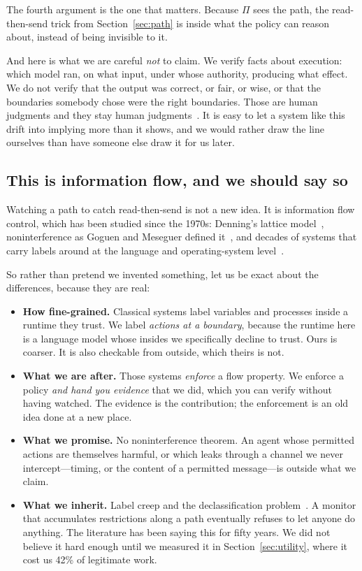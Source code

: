 \documentclass[11pt]{article}
\begin{document}
The fourth argument is the one that matters. Because $\Pi$ sees the path, the
read-then-send trick from Section~\ref{sec:path} is inside what the policy can
reason about, instead of being invisible to it.

And here is what we are careful \emph{not} to claim. We verify facts about
execution: which model ran, on what input, under whose authority, producing
what effect. We do not verify that the output was correct, or fair, or wise,
or that the boundaries somebody chose were the right boundaries. Those are
human judgments and they stay human judgments~\cite{iso42001}. It is easy to
let a system like this drift into implying more than it shows, and we would
rather draw the line ourselves than have someone else draw it for us later.

\subsection{This is information flow, and we should say so}
\label{sec:ifc}

Watching a path to catch read-then-send is not a new idea. It is information
flow control, which has been studied since the 1970s: Denning's lattice
model~\cite{denning1976,denning1977}, noninterference as
Goguen and Meseguer defined it~\cite{goguen1982}, and decades of systems that
carry labels around at the language and operating-system
level~\cite{myers1997,myers1999,sabelfeld2003,histar,flume}.

So rather than pretend we invented something, let us be exact about the
differences, because they are real:

\begin{itemize}[itemsep=2pt,topsep=2pt]
\item \textbf{How fine-grained.} Classical systems label variables and
processes inside a runtime they trust. We label \emph{actions at a boundary},
because the runtime here is a language model whose insides we specifically
decline to trust. Ours is coarser. It is also checkable from outside, which
theirs is not.
\item \textbf{What we are after.} Those systems \emph{enforce} a flow
property. We enforce a policy \emph{and hand you evidence} that we did, which
you can verify without having watched. The evidence is the contribution; the
enforcement is an old idea done at a new place.
\item \textbf{What we promise.} No noninterference theorem. An agent whose
permitted actions are themselves harmful, or which leaks through a channel we
never intercept---timing, or the content of a permitted message---is outside
what we claim.
\item \textbf{What we inherit.} Label creep and the declassification
problem~\cite{sabelfeld2003}. A monitor that accumulates restrictions along a
path eventually refuses to let anyone do anything. The literature has been
saying this for fifty years. We did not believe it hard enough until we
measured it in Section~\ref{sec:utility}, where it cost us 42\% of legitimate
work.
\end{itemize}
\end{document}
